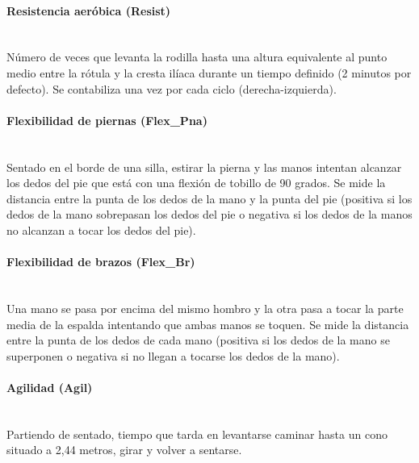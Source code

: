 \paragraph{Resistencia aeróbica (Resist)}\mbox{}\\

Número de veces que levanta la rodilla hasta una altura equivalente al punto medio entre la rótula y la cresta ilíaca durante un tiempo definido (2 minutos por defecto). Se contabiliza una vez por cada ciclo (derecha-izquierda).


\paragraph{Flexibilidad de piernas (Flex\_Pna)}\mbox{}\\

Sentado en el borde de una silla, estirar la pierna y las manos intentan alcanzar los dedos del pie que está con una flexión de tobillo de 90 grados. Se mide la distancia entre la punta de los dedos de la mano y la punta del pie (positiva si los dedos de la mano sobrepasan los dedos del pie o negativa si los dedos de la manos no alcanzan a tocar los dedos del pie).


\paragraph{Flexibilidad de brazos (Flex\_Br)}\mbox{}\\

Una mano se pasa por encima del mismo hombro y la otra pasa a tocar la parte media de la espalda intentando que ambas manos se toquen. Se mide la distancia entre la punta de los dedos de cada mano (positiva si los dedos de la mano se superponen o negativa si no llegan a tocarse los dedos de la mano).


\paragraph{Agilidad (Agil)}\mbox{}\\

Partiendo de sentado, tiempo que tarda en levantarse caminar hasta un cono situado a 2,44 metros, girar y volver a sentarse.

